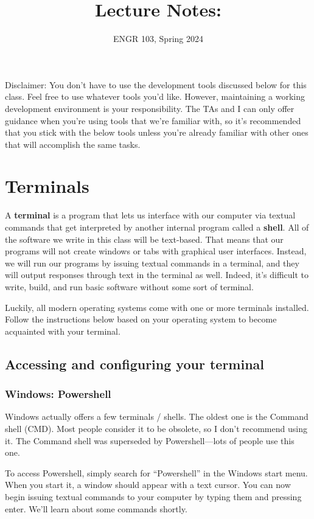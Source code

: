 \documentclass{article}
\title{
    Lecture Notes: \lecturetitle
}
\author{ENGR 103, Spring 2024}
\date{}
\begin{document}
\maketitle

Disclaimer: You don't have to use the development tools discussed below for this class. Feel free to use whatever tools you'd like. However, maintaining a working development environment is your responsibility. The TAs and I can only offer guidance when you're using tools that we're familiar with, so it's recommended that you stick with the below tools unless you're already familiar with other ones that will accomplish the same tasks.

\section{Terminals}

A \textbf{terminal} is a program that lets us interface with our computer via textual commands that get interpreted by another internal program called a \textbf{shell}. All of the software we write in this class will be text-based. That means that our programs will not create windows or tabs with graphical user interfaces. Instead, we will run our programs by issuing textual commands in a terminal, and they will output responses through text in the terminal as well. Indeed, it's difficult to write, build, and run basic software without some sort of terminal.

Luckily, all modern operating systems come with one or more terminals installed. Follow the instructions below based on your operating system to become acquainted with your terminal.

\subsection{Accessing and configuring your terminal}

\subsubsection{Windows: Powershell}

Windows actually offers a few terminals / shells. The oldest one is the Command shell (CMD). Most people consider it to be obsolete, so I don't recommend using it. The Command shell was superseded by Powershell---lots of people use this one.

To access Powershell, simply search for ``Powershell'' in the Windows start menu. When you start it, a window should appear with a text cursor. You can now begin issuing textual commands to your computer by typing them and pressing enter. We'll learn about some commands shortly.
\end{document}
